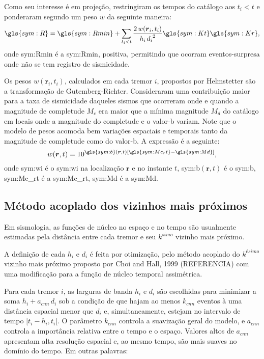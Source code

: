 Como seu interesse é em projeção, restringiram os tempos do catálogo aos $t_i
< t$ e ponderaram segundo um peso $w$ da seguinte maneira:
\begin{equation}
\ensuremath{\gls{sym:R} = \gls{sym:Rmin} + \sum_{t_i < t}{ 
	\frac{2\,w(\boldsymbol{r}_i,t_i)}{h_i\,{d_i}^2}
			\gls{sym:Kt}\gls{sym:Kr} }},
	\label{eq:helms02}
\end{equation}
onde \gls{sym:Rmin} é a \glsdesc{sym:Rmin}, positiva, permitindo que ocorram eventos-surpresa 
onde não se tem registro de sismicidade.

Os pesos $w(\boldsymbol{r}_i,t_i)$, calculados em cada tremor $i$, propostos por Helmstetter são a transformação de
Gutemberg-Richter. Consideraram uma contribuição maior para a taxa de sismicidade daqueles sismos 
que ocorreram onde e quando a magnitude de completude $M_c$ era maior que 
a mínima magnitude $M_d$ do catálogo 
em locais onde a magnitude do completude e o valor-b variam. 
Note que o modelo de pesos acomoda bem variações espaciais e
temporais tanto da magnitude de completude como do valor-b. A expressão é a seguinte:
\begin{equation}
	\ensuremath{ w(\boldsymbol{r},t) = 10^{ \gls{sym:b}(\boldsymbol{r},t) \left[ \gls{sym:Mc_rt} - \gls{sym:Md}
	\right] } },
	\label{eq:helms_wi}
\end{equation}
onde  \gls{sym:wi} é o \glsdesc{sym:wi} na localização $\boldsymbol{r}$ e no instante $t$, 
	  \gls{sym:b}$(\boldsymbol{r},t)$ é o \glsdesc{sym:b}, 
	  \gls{sym:Mc_rt} é a \glsdesc{sym:Mc_rt}, 
	  \gls{sym:Md} é a \glsdesc{sym:Md}.

\subsection{Método acoplado dos vizinhos mais próximos}

Em sismologia, as funções de núcleo no espaço e no tempo são usualmente estimadas
pela distância entre cada tremor e seu $k^{simo}$ vizinho mais próximo. 

A definição de cada $h_i$ e $d_i$ é feita por otimização, 
pelo método acoplado do $k^{ésimo}$ vizinho mais próximo
proposto por Choi and Hall, 1999 (REFERENCIA)
com uma modificação para a função de núcleo temporal assimétrica.

Para cada tremor $i$, as larguras de banda  $h_i$ e $d_i$ são escolhidas para
minimizar a soma $h_i + a_{cnn}\,d_i$ sob a condição de que hajam ao menos $k_{cnn}$
eventos à uma distância espacial menor que $d_i$ e, simultaneamente, estejam
no intervalo de tempo $[t_i - h_i, t_i[$. O parâmetro $k_{cnn}$ controla a suavização 
geral do modelo, e $a_{cnn}$ controla a importância relativa entre o tempo e o espaço.
Valores altos de $a_{cnn}$ apresentam alta resolução espacial e, ao mesmo tempo, 
são mais suaves no domínio do tempo. Em outras palavras:

